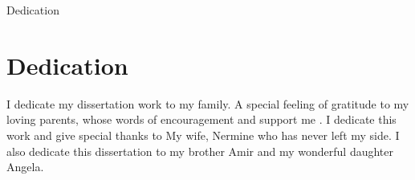 Dedication
\chapter{Dedication}

I dedicate my dissertation work to my family. A special feeling of gratitude to my loving parents, whose words of encouragement and support me . I dedicate this work and give special thanks to My wife, Nermine who has never left my side. I also dedicate this dissertation to my brother Amir and my wonderful daughter Angela. 
